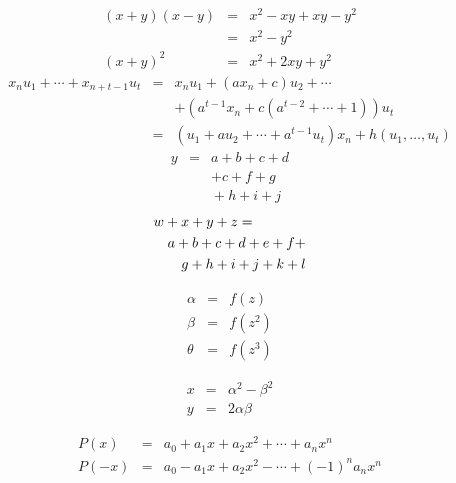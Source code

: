 \documentclass{article}
\begin{document}
	\begin{eqnarray}
		(x+y)(x-y) & = & x^2-xy+xy-y^2 \nonumber\\
				& = & x^2 - y^2 \\
		(x+y)^2   & = & x^2 + 2xy + y^2
	\end{eqnarray}
	\begin{eqnarray*}
		x_nu_1 + \cdots + x_{n+t-1}u_t & = & x_nu_1 + (ax_n + c)u_2 + \cdots\\
		& & + \left(a^{t-1}x_n + c(a^{t-2} + \cdots + 1)\right)u_t \\
		& = & (u_1 + au_2 + \cdots + a^{t-1}u_t)x_n + h(u_1, \ldots, u_t)
	\end{eqnarray*}
	\begin{eqnarray*}
		y & = & a + b + c + d\\
		 &   & + c + f +g \\
		&   & {} + h + i + j %
	\end{eqnarray*}
	\begin{eqnarray*}
		\lefteqn{w+x+y+z = }\\ %
		& & a+b+c+d+e+f+\\
		& & g+h+i+j+k+l
	\end{eqnarray*}
	\parbox{4cm}{\begin{eqnarray} \alpha & = & f(z) \\
						\beta & = & f(z^2) \\
						\theta & = & f(z^3)
			\end{eqnarray}}
		\hfill \parbox{2.5cm}{\begin{eqnarray*}
			x & = & \alpha^2 - \beta^2 \\
			y & = & 2\alpha\beta
			\end{eqnarray*}}
	\parbox{10cm}{\begin{eqnarray*}
			P(x) & = & a_0 + a_1x + a_2x^2 + \cdots + a_nx^n\\
			P(-x) & = & a_0 - a_1x + a_2x^2 - \cdots + (-1)^na_nx^n
			\end{eqnarray*}} \hfill
	\parbox{1cm}{\begin{eqnarray} \end{eqnarray}}
	\\
	\fbox{\parbox{5cm}{\[ \int ^ \infty_0 f(x)\,dx \approx \sum_{i = 1}^n w_i e^{x_i} f(x_i) \]}}
\end{document}
